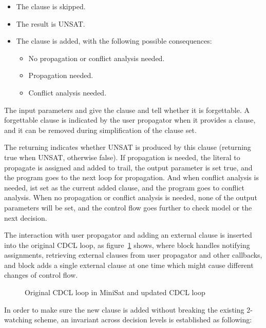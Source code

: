 \begin{itemize}
  \item The clause is skipped.
  \item The result is UNSAT.
  \item The clause is added, with the following possible consequences:
    \begin{itemize}
      \item No propagation or conflict analysis needed.
      \item Propagation needed.
      \item Conflict analysis needed.
    \end{itemize}
\end{itemize}

The input parameters  and  give the clause and tell whether it is forgettable. A forgettable clause is indicated by the user propagator when it provides a clause, and it can be removed during simplification of the clause set.

The returning  indicates whether UNSAT is produced by this clause (returning true when UNSAT, otherwise false). If propagation is needed, the literal to propagate is assigned and added to trail, the output parameter  is set true, and the program goes to the next loop for propagation. And when conflict analysis is needed,  ist set as the current added clause, and the program goes to conflict analysis. When no propagation or conflict analysis is needed, none of the output parameters will be set, and the control flow goes further to check model or the next decision.

The interaction with user propagator and adding an external clause is inserted into the original CDCL loop, as figure~\ref{fig:flow} shows, where  block handles notifying assignments, retrieving external clauses from user propagator and other callbacks, and  block adds a single external clause at one time which might cause different changes of control flow.

\begin{figure}[h!]
  \centering
  
  \caption{Original CDCL loop in MiniSat and updated CDCL loop}
  \label{fig:flow}
\end{figure}

In order to make sure the new clause is added without breaking the existing 2-watching scheme, an invariant across decision levels is established as following:

